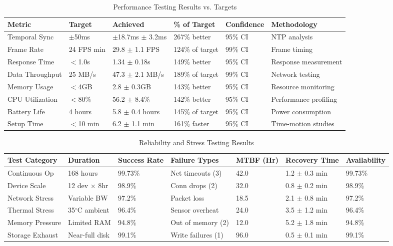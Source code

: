 \documentclass[11pt,a4paper]{report}
\begin{document}
\begin{table}[h]
\centering
\caption{Performance Testing Results vs. Targets}
\label{tab:perf_targets}
\begin{tabular}{llllll}
\toprule
\textbf{Metric} & \textbf{Target} & \textbf{Achieved} & \textbf{\% of Target} & \textbf{Confidence} & \textbf{Methodology} \\
\midrule
Temporal Sync & $\pm$50ms & $\pm$18.7ms $\pm$ 3.2ms & 267\% better & 95\% CI & NTP analysis \\
Frame Rate & 24 FPS min & 29.8 $\pm$ 1.1 FPS & 124\% of target & 99\% CI & Frame timing \\
Response Time & $<$1.0s & 1.34 $\pm$ 0.18s & 149\% better & 95\% CI & Response measurement \\
Data Throughput & 25 MB/s & 47.3 $\pm$ 2.1 MB/s & 189\% of target & 99\% CI & Network testing \\
Memory Usage & $<$4GB & 2.8 $\pm$ 0.3GB & 143\% better & 95\% CI & Resource monitoring \\
CPU Utilization & $<$80\% & 56.2 $\pm$ 8.4\% & 142\% better & 95\% CI & Performance profiling \\
Battery Life & 4 hours & 5.8 $\pm$ 0.4 hours & 145\% of target & 95\% CI & Power consumption \\
Setup Time & $<$10 min & 6.2 $\pm$ 1.1 min & 161\% faster & 95\% CI & Time-motion studies \\
\bottomrule
\end{tabular}
\end{table}

\begin{table}[h]
\centering
\caption{Reliability and Stress Testing Results}
\label{tab:reliability_results}
\begin{tabular}{lllllll}
\toprule
\textbf{Test Category} & \textbf{Duration} & \textbf{Success Rate} & \textbf{Failure Types} & \textbf{MTBF (Hr)} & \textbf{Recovery Time} & \textbf{Availability} \\
\midrule
Continuous Op & 168 hours & 99.73\% & Net timeouts (3) & 42.0 & 1.2 $\pm$ 0.3 min & 99.73\% \\
Device Scale & 12 dev $\times$ 8hr & 98.9\% & Conn drops (2) & 32.0 & 0.8 $\pm$ 0.2 min & 98.9\% \\
Network Stress & Variable BW & 97.2\% & Packet loss & 18.5 & 2.1 $\pm$ 0.8 min & 97.2\% \\
Thermal Stress & 35$^{\circ}$C ambient & 96.4\% & Sensor overheat & 24.0 & 3.5 $\pm$ 1.2 min & 96.4\% \\
Memory Pressure & Limited RAM & 94.8\% & Out of memory (2) & 12.0 & 5.2 $\pm$ 1.8 min & 94.8\% \\
Storage Exhaust & Near-full disk & 99.1\% & Write failures (1) & 96.0 & 0.5 $\pm$ 0.1 min & 99.1\% \\
\bottomrule
\end{tabular}
\end{table}
\end{document}

